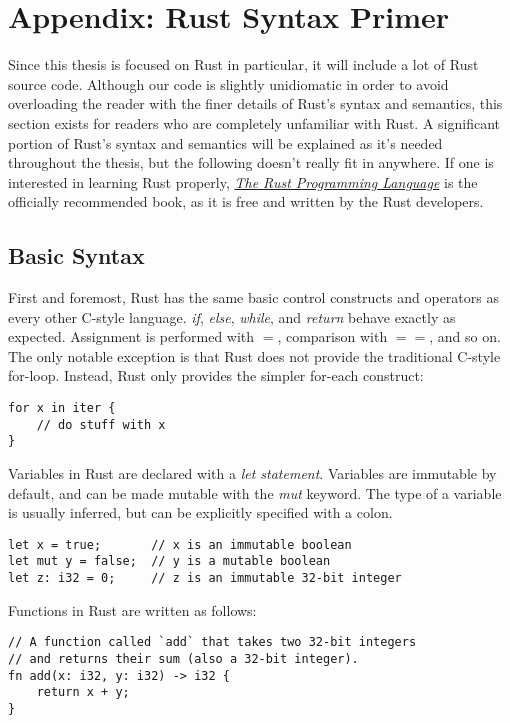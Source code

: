 \chapter{Appendix: Rust Syntax Primer}
\label{ch:syntax}

Since this thesis is focused on Rust in particular, it will include a lot of
Rust source code. Although our code is slightly unidiomatic
in order to avoid overloading the reader with the finer details of Rust's syntax
and semantics, this section exists for readers who are completely unfamiliar
with Rust. A significant portion of Rust's syntax and semantics will be
explained as it's needed throughout the thesis, but the following doesn't
really fit in anywhere. If one is interested in learning Rust properly,
\href{https://doc.rust-lang.org/book/}{\emph{The Rust Programming Language}}
is the officially recommended book, as it is free and written by the Rust developers.




\section{Basic Syntax}

First and foremost, Rust has the same basic control constructs and operators
as every other C-style language. \emph{if}, \emph{else}, \emph{while}, and
\emph{return} behave exactly as expected. Assignment is performed with $=$,
comparison with $==$, and so on. The only notable exception is that Rust does
not provide the traditional C-style for-loop. Instead, Rust only provides the
simpler for-each construct:

\begin{verbatim}
for x in iter {
    // do stuff with x
}
\end{verbatim}

Variables in Rust are declared with a \emph{let statement}. Variables are
immutable by default, and can be made mutable with the \emph{mut}
keyword. The type of a variable is usually inferred, but can be explicitly
specified with a colon.

\begin{verbatim}
let x = true;       // x is an immutable boolean
let mut y = false;  // y is a mutable boolean
let z: i32 = 0;     // z is an immutable 32-bit integer
\end{verbatim}

Functions in Rust are written as follows:

\begin{verbatim}
// A function called `add` that takes two 32-bit integers
// and returns their sum (also a 32-bit integer).
fn add(x: i32, y: i32) -> i32 {
    return x + y;
}
\end{verbatim}

